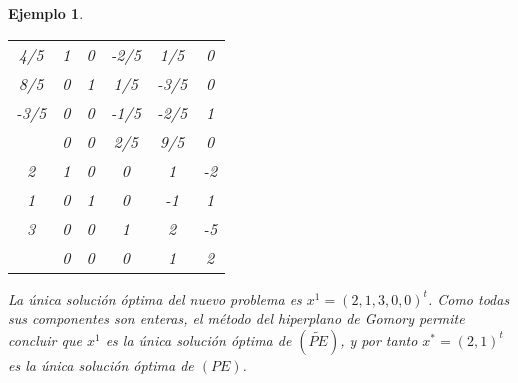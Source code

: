 \documentclass[11pt]{report}
\theoremstyle{mytheorem}
\theoremstyle{mydefinition}
\theoremstyle{myexample}
\newtheorem*{example}{Ejemplo}
\begin{document}
\begin{example}
\begin{center}
\begin{tabular}{|c|c|c|c|c|c|}
    \cline{1-6}

    \phantom{-}4/5 & \multicolumn{1}{c}{\phantom{-}1} & \multicolumn{1}{c}{\phantom{-}0} & \multicolumn{1}{c}{-2/5} & \multicolumn{1}{c}{\phantom{-}1/5} & \multicolumn{1}{c|}{\phantom{-}0} \\

    \phantom{-}8/5 & \multicolumn{1}{c}{\phantom{-}0} & \multicolumn{1}{c}{\phantom{-}1} & \multicolumn{1}{c}{\phantom{-}1/5} & \multicolumn{1}{c}{-3/5} & \multicolumn{1}{c|}{\phantom{-}0} \\

    -3/5 & \multicolumn{1}{c}{\phantom{-}0} & \multicolumn{1}{c}{\phantom{-}0} & \multicolumn{1}{c}{-1/5} & \multicolumn{1}{c}{-2/5} & \multicolumn{1}{c|}{\phantom{-}1} \\ \cline{1-6}
    
    \multicolumn{1}{c|}{} & \multicolumn{1}{c}{\phantom{-}0} & \multicolumn{1}{c}{\phantom{-}0} & \multicolumn{1}{c}{\phantom{-}2/5} & \multicolumn{1}{c}{\phantom{-}9/5} & \multicolumn{1}{c|}{\phantom{-}0} \\ \hhline{|=|=|=|=|=|=|}

    \phantom{-}2 & \multicolumn{1}{c}{\phantom{-}1} & \multicolumn{1}{c}{\phantom{-}0} & \multicolumn{1}{c}{\phantom{-}0} & \multicolumn{1}{c}{\phantom{-}1} & \multicolumn{1}{c|}{-2} \\

    \phantom{-}1 & \multicolumn{1}{c}{\phantom{-}0} & \multicolumn{1}{c}{\phantom{-}1} & \multicolumn{1}{c}{\phantom{-}0} & \multicolumn{1}{c}{-1} & \multicolumn{1}{c|}{\phantom{-}1} \\

    \phantom{-}3 & \multicolumn{1}{c}{\phantom{-}0} & \multicolumn{1}{c}{\phantom{-}0} & \multicolumn{1}{c}{\phantom{-}1} & \multicolumn{1}{c}{\phantom{-}2} & \multicolumn{1}{c|}{-5} \\ \cline{1-6}
    
    \multicolumn{1}{c|}{} & \multicolumn{1}{c}{\phantom{-}0} & \multicolumn{1}{c}{\phantom{-}0} & \multicolumn{1}{c}{\phantom{-}0} & \multicolumn{1}{c}{\phantom{-}1} & \multicolumn{1}{c|}{\phantom{-}2} \\ \cline{2-6}
\end{tabular}
\end{center}
La única solución óptima del nuevo problema es $x^1=(2,1,3,0,0)^t$. Como todas sus componentes son enteras, el método del hiperplano de Gomory permite concluir que $x^1$ es la única solución óptima de $(\widetilde{PE})$, y por tanto $x^*=(2,1)^t$ es la única solución óptima de $(PE)$.
\end{example}
\end{document}
